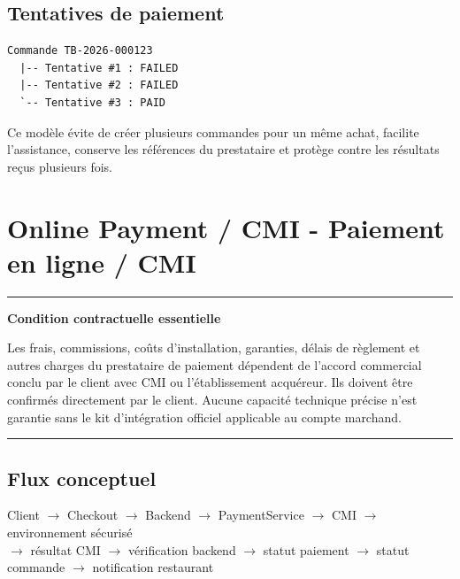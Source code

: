 \documentclass[10pt,a4paper]{article}
\newenvironment{callout}[1]{\par\medskip\noindent\begin{minipage}{\linewidth}\color{navy}\hrule\smallskip\textbf{#1}\par\smallskip\color{black}}{\smallskip\color{navy}\hrule\end{minipage}\par\medskip}
\begin{document}
\subsection{Tentatives de paiement}
\begin{verbatim}
Commande TB-2026-000123
  |-- Tentative #1 : FAILED
  |-- Tentative #2 : FAILED
  `-- Tentative #3 : PAID
\end{verbatim}
Ce modèle évite de créer plusieurs commandes pour un même achat, facilite l'assistance, conserve les références du prestataire et protège contre les résultats reçus plusieurs fois.

\section{Online Payment / CMI - Paiement en ligne / CMI}
\begin{callout}{Condition contractuelle essentielle}
Les frais, commissions, coûts d'installation, garanties, délais de règlement et autres charges du prestataire de paiement dépendent de l'accord commercial conclu par le client avec CMI ou l'établissement acquéreur. Ils doivent être confirmés directement par le client. Aucune capacité technique précise n'est garantie sans le kit d'intégration officiel applicable au compte marchand.
\end{callout}

\subsection{Flux conceptuel}
\begin{center}
Client $\rightarrow$ Checkout $\rightarrow$ Backend $\rightarrow$ PaymentService $\rightarrow$ CMI $\rightarrow$ environnement sécurisé\\
$\rightarrow$ résultat CMI $\rightarrow$ vérification backend $\rightarrow$ statut paiement $\rightarrow$ statut commande $\rightarrow$ notification restaurant
\end{center}
\end{document}

